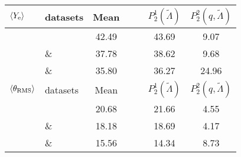 \begin{table}[t]
\begin{center}
{\begin{tabular}{l|l|ccccc}
            \hline\hline
            $\langle Y_{\rm e}\rangle$ & datasets & Mean &  & & $P_2^1(\tilde{\Lambda})$ & $P_2^2(q,\tilde{\Lambda})$ \\ \hline
            & \DSrefset{} & 42.49 &  & & 43.69 & 9.07 \\ 
            & \& \DSheatcool{}  & 37.78 &  & & 38.62 & 9.68 \\ 
            & \& \DScool{}  & 35.80 &  & & 36.27 & 24.96 \\ 
            \hline\hline
            $\langle \theta_{\rm RMS}\rangle$ & datasets & Mean & & & $P_2^1(\tilde{\Lambda})$ & $P_2^2(q,\tilde{\Lambda})$ \\ \hline
            & \DSrefset{} & 20.68 & & & 21.66 & 4.55 \\ 
            & \& \DSheatcool{}  & 18.18 & & & 18.69 & 4.17 \\ 
            & \& \DScool{}  & 15.56 & & & 14.34 & 8.73 \\ 
            \hline\hline
        \end{tabular}
    }%
    \end{center}
\end{table}



